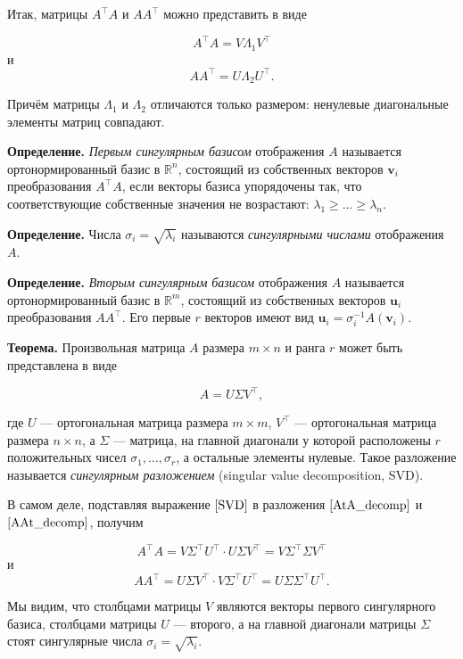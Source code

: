 \documentclass[11pt,a4paper]{article}
\begin{document}
Итак, матрицы \(A^\top A\) и \(A A^\top\) можно представить в виде

\[ A^\top A = V \Lambda_1 V^\top  \tag{1}\label{AtA_decomp} \] и
\[ A A^\top = U \Lambda_2 U^\top. \tag{2}\label{AAt_decomp} \]

Причём матрицы \(\Lambda_1\) и \(\Lambda_2\) отличаются только размером:
ненулевые диагональные элементы матриц совпадают.

\textbf{Определение.} \emph{Первым сингулярным базисом} отображения
\(A\) называется ортонормированный базис в \(\mathbb{R}^n\), состоящий
из собственных векторов \(\mathbf{v}_i\) преобразования \(A^\top A\),
если векторы базиса упорядочены так, что соответствующие собственные
значения не возрастают: \(\lambda_1 \ge \ldots \ge \lambda_n\).

\textbf{Определение.} Числа \(\sigma_i = \sqrt{\lambda_i}\) называются
\emph{сингулярными числами} отображения \(A\).

\textbf{Определение.} \emph{Вторым сингулярным базисом} отображения
\(A\) называется ортонормированный базис в \(\mathbb{R}^m\), состоящий
из собственных векторов \(\mathbf{u}_i\) преобразования \(A A^\top\).
Его первые \(r\) векторов имеют вид
\(\mathbf{u}_i = \sigma_i^{-1} A(\mathbf{v}_i)\).

\textbf{Теорема.} Произвольная матрица \(A\) размера \(m \times n\) и
ранга \(r\) может быть представлена в виде

\[ A = U \Sigma V^\top, \tag{3}\label{SVD} \]

где \(U\) --- ортогональная матрица размера \(m \times m\), \(V^\top\)
--- ортогональная матрица размера \(n \times n\), а \(\Sigma\) ---
матрица, на главной диагонали у которой расположены \(r\) положительных
чисел \(\sigma_1, \ldots, \sigma_r\), а остальные элементы нулевые.
Такое разложение называется \emph{сингулярным разложением} (singular
value decomposition, SVD).

В самом деле, подставляя выражение \(\eqref{SVD}\) в разложения
\(\eqref{AtA_decomp}\) и \(\eqref{AAt_decomp}\), получим

\[ A^\top A = V \Sigma^\top U^\top \cdot U \Sigma V^\top = V \Sigma^\top \Sigma V^\top \]
и
\[ A A^\top = U \Sigma V^\top \cdot V \Sigma^\top U^\top = U \Sigma \Sigma^\top U^\top. \]

Мы видим, что столбцами матрицы \(V\) являются векторы первого
сингулярного базиса, столбцами матрицы \(U\) --- второго, а на главной
диагонали матрицы \(\Sigma\) стоят сингулярные числа
\(\sigma_i = \sqrt{\lambda_i}\).
\end{document}
